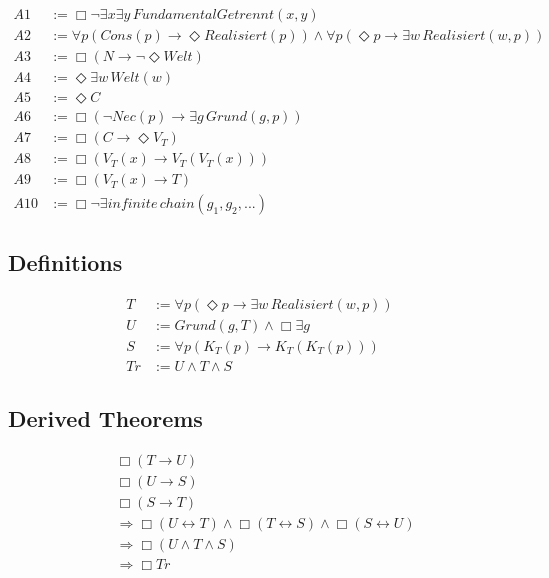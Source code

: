 \documentclass[
]{article}
\begin{document}
\[
\begin{aligned}
A1 &:= \Box\neg\exists x\exists y\, FundamentalGetrennt(x,y) \\
A2 &:= \forall p(Cons(p) \rightarrow \Diamond Realisiert(p)) \land \forall p(\Diamond p \rightarrow \exists w\, Realisiert(w,p)) \\
A3 &:= \Box(N \rightarrow \neg\Diamond Welt) \\
A4 &:= \Diamond\exists w\, Welt(w) \\
A5 &:= \Diamond C \\
A6 &:= \Box(\neg Nec(p) \rightarrow \exists g\, Grund(g,p)) \\
A7 &:= \Box(C \rightarrow \Diamond V_T) \\
A8 &:= \Box(V_T(x) \rightarrow V_T(V_T(x))) \\
A9 &:= \Box(V_T(x) \rightarrow T) \\
A10 &:= \Box\neg\exists infinite\, chain(g_1, g_2, ...)
\end{aligned}
\]

\subsection{Definitions}\label{definitions}

\[
\begin{aligned}
T &:= \forall p(\Diamond p \rightarrow \exists w\, Realisiert(w,p)) \\
U &:= Grund(g, T) \land \Box \exists g \\
S &:= \forall p(K_T(p) \rightarrow K_T(K_T(p))) \\
Tr &:= U \land T \land S
\end{aligned}
\]

\subsection{Derived Theorems}\label{derived-theorems}

\[
\begin{aligned}
& \Box(T \rightarrow U) \\
& \Box(U \rightarrow S) \\
& \Box(S \rightarrow T) \\
& \Rightarrow \Box(U \leftrightarrow T) \land \Box(T \leftrightarrow S) \land \Box(S \leftrightarrow U) \\
& \Rightarrow \Box(U \land T \land S) \\
& \Rightarrow \Box Tr
\end{aligned}
\]
\end{document}

